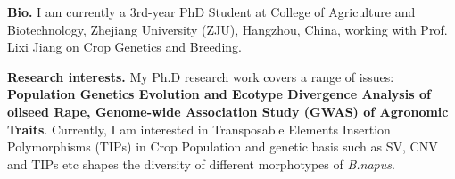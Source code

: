 %
%

\par{
{\textbf{Bio.}} 
I am currently a 3rd-year PhD Student at College of Agriculture and Biotechnology, Zhejiang University (ZJU), Hangzhou, China, 
 working with Prof. Lixi Jiang on Crop Genetics and Breeding. 

{\textbf{Research interests.}} 
My Ph.D research work covers a range of issues: \textbf{Population Genetics Evolution and Ecotype Divergence Analysis of oilseed Rape, 
Genome-wide Association Study (GWAS) of Agronomic Traits}. Currently, I am interested in Transposable Elements Insertion Polymorphisms (TIPs) in Crop Population and genetic basis such as SV, CNV and TIPs etc shapes the diversity of different morphotypes of \emph{B.napus}.  
}
